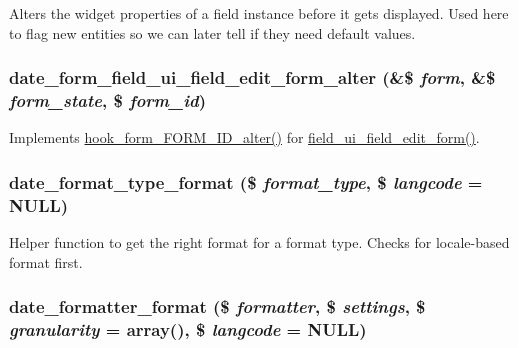 Alters the widget properties of a field instance before it gets displayed. Used here to flag new entities so we can later tell if they need default values. \hypertarget{date_8module_aa03c845a994be25b8d52c0ed091deebc}{
\subsubsection[{date\_\-form\_\-field\_\-ui\_\-field\_\-edit\_\-form\_\-alter}]{\setlength{\rightskip}{0pt plus 5cm}date\_\-form\_\-field\_\-ui\_\-field\_\-edit\_\-form\_\-alter (\&\$ {\em form}, \/  \&\$ {\em form\_\-state}, \/  \$ {\em form\_\-id})}}
\label{date_8module_aa03c845a994be25b8d52c0ed091deebc}
Implements \hyperlink{group__hooks_ga8d4a4089551493d55911bd5c4f218264}{hook\_\-form\_\-FORM\_\-ID\_\-alter()} for \hyperlink{group__forms_ga11660e91b3649ff30bf665c00f1a9af2}{field\_\-ui\_\-field\_\-edit\_\-form()}. \hypertarget{date_8module_a312afe2762238ca96afc11ea85b88dfd}{
\subsubsection[{date\_\-format\_\-type\_\-format}]{\setlength{\rightskip}{0pt plus 5cm}date\_\-format\_\-type\_\-format (\$ {\em format\_\-type}, \/  \$ {\em langcode} = {\ttfamily NULL})}}
\label{date_8module_a312afe2762238ca96afc11ea85b88dfd}
Helper function to get the right format for a format type. Checks for locale-\/based format first. \hypertarget{date_8module_a1fc73aa4ebc3a08f155eec42918f32c6}{
\subsubsection[{date\_\-formatter\_\-format}]{\setlength{\rightskip}{0pt plus 5cm}date\_\-formatter\_\-format (\$ {\em formatter}, \/  \$ {\em settings}, \/  \$ {\em granularity} = {\ttfamily array()}, \/  \$ {\em langcode} = {\ttfamily NULL})}}
